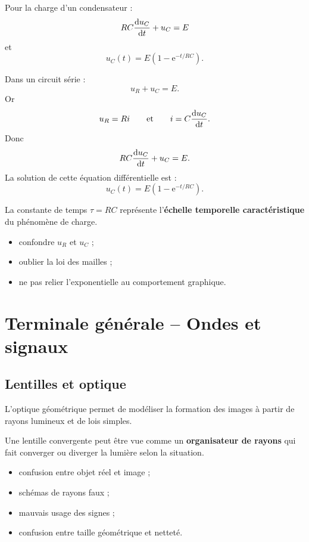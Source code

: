 \documentclass[11pt,a4paper]{article}
\newcommand{\e}{\mathrm{e}}
\begin{document}
\begin{bilan}
Pour la charge d'un condensateur :
\[
RC\dv{u_C}{t}+u_C=E
\]
et
\[
u_C(t)=E\left(1-\e^{-t/RC}\right).
\]
\end{bilan}

\begin{demo}
Dans un circuit série :
\[
u_R+u_C=E.
\]
Or
\[
u_R=Ri
\qquad \text{et} \qquad
i=C\dv{u_C}{t}.
\]
Donc
\[
RC\dv{u_C}{t}+u_C=E.
\]
La solution de cette équation différentielle est :
\[
u_C(t)=E\left(1-\e^{-t/RC}\right).
\]
\end{demo}

\begin{imagem}
La constante de temps \(\tau=RC\) représente l'\textbf{échelle temporelle caractéristique}
du phénomène de charge.
\end{imagem}

\begin{erreurs}
\begin{itemize}
    \item confondre \(u_R\) et \(u_C\) ;
    \item oublier la loi des mailles ;
    \item ne pas relier l'exponentielle au comportement graphique.
\end{itemize}
\end{erreurs}

\newpage

\section{Terminale générale -- Ondes et signaux}

\subsection{Lentilles et optique}

\begin{sens}
L'optique géométrique permet de modéliser la formation des images
à partir de rayons lumineux et de lois simples.
\end{sens}

\begin{imagem}
Une lentille convergente peut être vue comme un \textbf{organisateur de rayons}
qui fait converger ou diverger la lumière selon la situation.
\end{imagem}

\begin{erreurs}
\begin{itemize}
    \item confusion entre objet réel et image ;
    \item schémas de rayons faux ;
    \item mauvais usage des signes ;
    \item confusion entre taille géométrique et netteté.
\end{itemize}
\end{erreurs}
\end{document}
